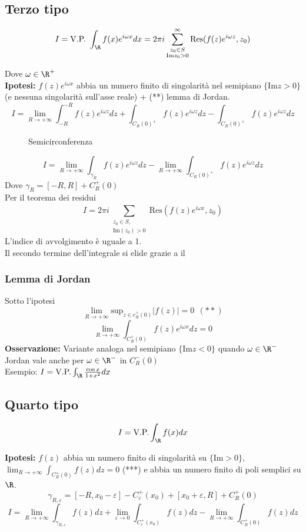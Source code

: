 \subsection{Terzo tipo}
\begin{tcolorbox}	
	\[I=\text{V.P.  }\int_{\R}^{} f(x)e^{i\omega x}dx=2 \pi i \sum_{\substack{z_0\in S\\\text{Im}z_0>0}}^{\infty} \text{Res}(f(z)e^{i\omega z},z_0)\] 
\end{tcolorbox}
Dove $\omega \in \R^+$
\\\textbf{Ipotesi: }$f(z)e^{i\omega x}$ abbia un numero finito di singolarità nel semipiano $\{\text{Im}z>0\} $ (e nessuna singolarità sull'asse reale) + (**) lemma di Jordan.
\[I=\lim_{R \to +\infty} \int_{-R}^{-R} f(z)e^{i\omega z}dz+\int_{C_R(0)^+}^{} f(z)e^{i\omega z}dz-\int_{C_R(0)^+}^{} f(z)e^{i\omega z}dz \]
\begin{figure}[ht]
    \centering
    \caption{Semicirconferenza}
    \label{fig:semicirconferenza}
\end{figure}
\[I=\lim_{R \to +\infty} \int_{\gamma_R}{f(z)e^{i\omega z}dz} -\lim_{R \to +\infty} \int_{C_R(0)^+}^{} f(z)e^{i\omega z}dz\]
Dove $\gamma_R=[-R,R]+C_R^+(0)$
\\Per il teorema dei residui
\[I=2\pi i \sum_{\substack{z_0\in S,\\  \text{Im}(z_0)>0}}^{} \text{Res}(f(z)e^{i\omega x},z_0)\]
L'indice di avvolgimento è uguale a 1.\\
Il secondo termine dell'integrale si elide grazie a il 
\subsubsection{Lemma di Jordan}
Sotto l'ipotesi 
\[\lim_{R \to +\infty}\text{sup}_{z\in c_R^+(0)}|f(z)|=0  \ \ (**)\]
\[\lim_{R \to +\infty} \int_{C_R^+(0)}^{} f(z)e^{i\omega x}dz=0\] 
\textbf{Osservazione:} Variante analoga nel semipiano $\{\text{Im}z<0\} $ quando $\omega \in \R^-$
\\Jordan vale anche per $\omega \in \R^-$ in $C_R^-(0)$
\\Esempio: $I= \text{V.P.}\int_{\R}^{} \frac{\cos x}{1+x^2}dx$
\subsection{Quarto tipo}
\begin{tcolorbox}
\[I=\text{V.P.}\int_{\R}^{} f(x)dx\]	
\end{tcolorbox}
\textbf{Ipotesi:} $f(z)$ abbia un numero finito di singolarità su $\{\text{Im}>0\} $, \\$\lim_{R \to +\infty} \int_{C_R^+(0)}^{} f(z)dz=0$ (***) e abbia un numero finito di poli semplici su $\R$.
\[\gamma_{R,\varepsilon}=[-R,x_0-\varepsilon]-C_\varepsilon^+(x_0)+[x_0+\varepsilon,R]+C_R^+(0)\]
\[I=\lim_{R \to +\infty} \int_{\gamma_{R,\varepsilon}}f(z)dz + \lim_{\varepsilon \to 0} \int_{C_\varepsilon^+(x_0)}^{} f(z)dz-\lim_{R \to +\infty} \int_{C_R^+(0)}{f(z)dz}\]
